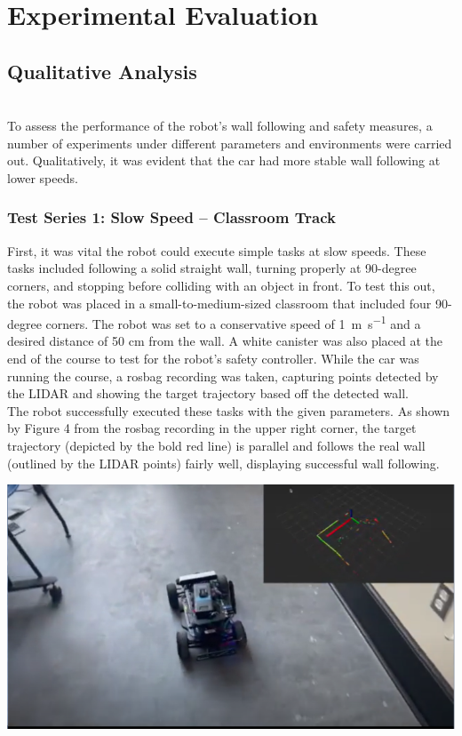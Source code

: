 \documentclass{article}
\begin{document}
\section{Experimental Evaluation}
\subsection{Qualitative Analysis}
\author{Jeremiah Budiman} \\

To assess the performance of the robot’s wall following and safety measures, a number of experiments under different parameters and environments were carried out. Qualitatively, it was evident that the car had more stable wall following at lower speeds.

\subsubsection{Test Series 1: Slow Speed – Classroom Track}

First, it was vital the robot could execute simple tasks at slow speeds. These tasks included following a solid straight wall, turning properly at 90-degree corners, and stopping before colliding with an object in front. To test this out, the robot was placed in a small-to-medium-sized classroom that included four 90-degree corners. The robot was set to a conservative speed of 1~\si{\meter\per\second} and a desired distance of 50 cm from the wall. A white canister was also placed at the end of the course to test for the robot’s safety controller. While the car was running the course, a rosbag recording was taken, capturing points detected by the LIDAR and showing the target trajectory based off the detected wall. \\

The robot successfully executed these tasks with the given parameters. As shown by Figure 4 from the rosbag recording in the upper right corner, the target trajectory (depicted by the bold red line) is parallel and follows the real wall (outlined by the LIDAR points) fairly well, displaying successful wall following. \\

\centerline{\includegraphics[width=.5\columnwidth]{pic1.png}}
\end{document}
